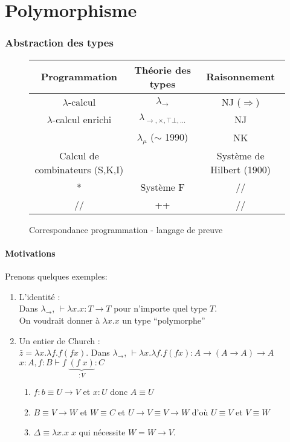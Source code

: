 \documentclass{article}
\newcommand\lterm[2]{\lambda #1. #2}
\newcommand\tlambda[0]{$\lambda$}
\begin{document}


\part{Polymorphisme}
\section{Abstraction des types}

\begin{figure}[h]
\begin{center}
\begin{tabular}{c | c | c}
Programmation & Théorie des types & Raisonnement\\
\hline
\tlambda-calcul & $\lambda_\to$ & NJ ($\Rightarrow$) \\
\tlambda-calcul enrichi & $\lambda_{\to,\times,\top\bot,...}$ & NJ\\
 &  $\lambda_\mu$ ($\sim$ 1990) & NK\\
Calcul de combinateurs (S,K,I) &  & Système de Hilbert (1900)\\
\hline
* & Système F & // \\
\hline // & ++ & //\\
\end{tabular}
\caption{Correspondance programmation - langage de preuve}
\end{center}
\end{figure}


\subsection{Motivations}
Prenons quelques exemples:
\begin{enumerate}
\item L'identité :\\
Dans $\lambda_\to$, $\vdash \lterm{x}{x} : T \to T$ pour n'importe quel type $T$.\\
On voudrait donner à $\lterm{x}{x}$ un type ``polymorphe''
\item Un entier de Church :\\
$\bar{z} = \lterm{x}{\lterm{f}{f (f x)}}$. Dans $\lambda_\to$, $\vdash \lterm{x}{\lterm{f}{f (f x)}} : A \to (A \to A) \to A$\\
$x:A, f:B \vdash f\;\underbrace{(f\;x)}_{:V} : C$
\begin{enumerate}[noitemsep]
\item $f:b \equiv U \to V$ et $x : U$ donc $A \equiv U$
\item $B \equiv V \to W$ et $W \equiv C$ et $U \to V \equiv V \to W$ d'où $U \equiv V$ et $V\equiv W$
\item $\Delta \equiv \lterm{x}{x\;x}$ qui nécessite $W=W\to V$.
\end{enumerate}
\end{enumerate}
\end{document}
